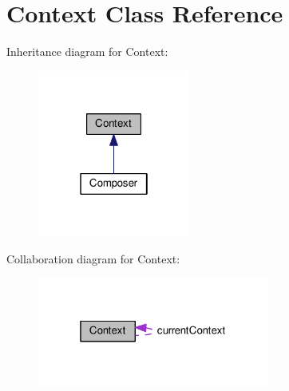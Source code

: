 \hypertarget{classContext}{}\section{Context Class Reference}
\label{classContext}


Inheritance diagram for Context\+:
\nopagebreak
\begin{figure}[H]
\begin{center}
\leavevmode
\includegraphics[width=142pt]{classContext__inherit__graph}
\end{center}
\end{figure}


Collaboration diagram for Context\+:
\nopagebreak
\begin{figure}[H]
\begin{center}
\leavevmode
\includegraphics[width=217pt]{classContext__coll__graph}
\end{center}
\end{figure}
